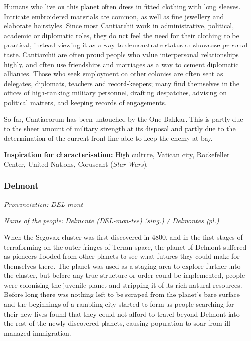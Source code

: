 Humans who live on this planet often dress in fitted clothing with long sleeves. Intricate embroidered materials are common, as well as fine jewellery and elaborate hairstyles. Since most Cantiarchii work in administrative, political, academic or diplomatic roles, they do not feel the need for their clothing to be practical, instead viewing it as a way to demonstrate status or showcase personal taste. Cantiarchii are often proud people who value interpersonal relationships highly, and often use friendships and marriages as a way to cement diplomatic alliances. Those who seek employment on other colonies are often sent as delegates, diplomats, teachers and record-keepers; many find themselves in the offices of high-ranking military personnel, drafting despatches, advising on political matters, and keeping records of engagements.

So far, Cantiacorum has been untouched by the One Bakkar. This is partly due to the sheer amount of military strength at its disposal and partly due to the determination of the current front line able to keep the enemy at bay.

\textbf{Inspiration for characterisation:} High culture, Vatican city, Rockefeller Center, United Nations, Coruscant (\textit{Star Wars}).

\subsubsection{Delmont}

\textit{Pronunciation: DEL-mont}

\textit{Name of the people: Delmonte (DEL-mon-tee) (sing.) / Delmontes (pl.)}

When the Segovax cluster was first discovered in 4800, and in the first stages of terraforming on the outer fringes of Terran space, the planet of Delmont suffered as pioneers flooded from other planets to see what futures they could make for themselves there. The planet was used as a staging area to explore further into the cluster, but before any true structure or order could be implemented, people were colonising the juvenile planet and stripping it of its rich natural resources. Before long there was nothing left to be scraped from the planet's bare surface and the beginnings of a rambling city started to form as people searching for their new lives found that they could not afford to travel beyond Delmont into the rest of the newly discovered planets, causing population to soar from ill-managed immigration.


